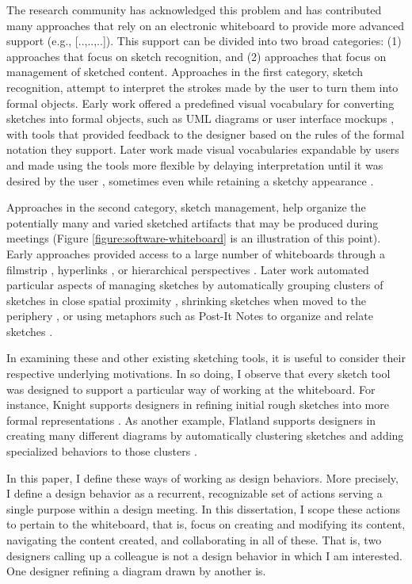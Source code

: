 The research community has acknowledged this problem and has contributed many approaches that rely on an electronic whiteboard to provide more advanced support (e.g., [..,..,..]). This support can be divided into two broad categories: (1) approaches that focus on sketch recognition, and (2) approaches that focus on management of sketched content. Approaches in the first category, sketch recognition, attempt to interpret the strokes made by the user to turn them into formal  objects. Early work offered a predefined visual vocabulary for converting sketches into formal objects, such as UML diagrams \cite{chen2008sumlow} or user interface mockups \cite{landay1995interactive}, with tools that provided feedback to the designer based on the rules of the formal notation they support. Later work made visual vocabularies expandable by users \cite{hammond2006ladder} and made using the tools more flexible by delaying interpretation until it was desired by the user \cite{damm2000supporting}, sometimes even while retaining a sketchy appearance \cite{chung2005inkkit}.

Approaches in the second category, sketch management, help organize the potentially many and varied sketched artifacts that may be produced during meetings (Figure \ref{figure:software-whiteboard} is an illustration of this point). Early approaches provided access to a large number of whiteboards through a filmstrip \cite{stefik1987beyond}, hyperlinks \cite{Streitz:1994:DIM:192844.193044}, or hierarchical perspectives \cite{newman2003denim}. Later work automated particular aspects of managing sketches by automatically grouping clusters of sketches in close spatial proximity \cite{mynatt1999flatland}, shrinking sketches when moved to the periphery \cite{guimbretiere2001fluid}, or using metaphors such as Post-It Notes to organize and relate sketches \cite{klemmer2001designers}.  

In examining these and other existing sketching tools, it is useful to consider their respective underlying motivations. In so doing, I observe that every sketch tool was designed to support a particular way of working at the whiteboard. For instance, Knight supports designers in refining initial rough sketches into more formal representations \cite{damm2000supporting}. As another example, Flatland supports designers in creating many different diagrams by automatically clustering sketches and adding specialized behaviors to those clusters \cite{mynatt1999flatland}.

In this paper, I define these ways of working as design behaviors. More precisely, I define a design behavior as a recurrent, recognizable set of actions serving a single purpose within a design meeting. In this dissertation, I scope these actions to pertain to the whiteboard, that is, focus on creating and modifying its content, navigating the content created, and collaborating in all of these. That is, two designers calling up a colleague is not a design behavior in which I am interested.  One designer refining a diagram drawn by another is.

